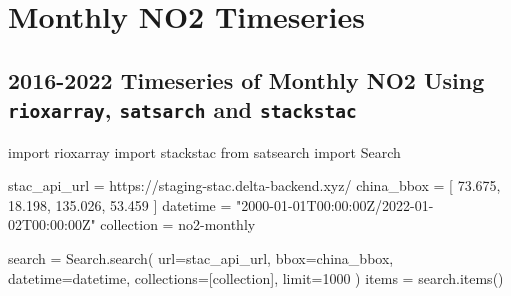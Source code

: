 \documentclass[
  letterpaper,
  DIV=11,
  numbers=noendperiod]{scrreprt}
\author{}
\date{}
\newenvironment{Shaded}{\begin{snugshade}}{\end{snugshade}}
\newcommand{\DecValTok}[1]{\textcolor[rgb]{0.68,0.00,0.00}{#1}}
\newcommand{\FloatTok}[1]{\textcolor[rgb]{0.68,0.00,0.00}{#1}}
\newcommand{\ImportTok}[1]{\textcolor[rgb]{0.00,0.46,0.62}{#1}}
\newcommand{\NormalTok}[1]{\textcolor[rgb]{0.00,0.46,0.62}{#1}}
\newcommand{\OperatorTok}[1]{\textcolor[rgb]{0.37,0.37,0.37}{#1}}
\newcommand{\StringTok}[1]{\textcolor[rgb]{0.13,0.47,0.30}{#1}}
\begin{document}
\hypertarget{monthly-no2-timeseries}{%
\chapter*{Monthly NO2 Timeseries}\label{monthly-no2-timeseries}}

\hypertarget{timeseries-of-monthly-no2-using-rioxarray-satsarch-and-stackstac}{%
\section{\texorpdfstring{2016-2022 Timeseries of Monthly NO2 Using
\texttt{rioxarray}, \texttt{satsarch} and
\texttt{stackstac}}{2016-2022 Timeseries of Monthly NO2 Using rioxarray, satsarch and stackstac}}\label{timeseries-of-monthly-no2-using-rioxarray-satsarch-and-stackstac}}

\begin{Shaded}
\begin{Highlighting}[]
\ImportTok{import}\NormalTok{ rioxarray}
\ImportTok{import}\NormalTok{ stackstac}
\ImportTok{from}\NormalTok{ satsearch }\ImportTok{import}\NormalTok{ Search}
\end{Highlighting}
\end{Shaded}

\begin{Shaded}
\begin{Highlighting}[]
\NormalTok{stac\_api\_url }\OperatorTok{=} \StringTok{\textquotesingle{}https://staging{-}stac.delta{-}backend.xyz/\textquotesingle{}}
\NormalTok{china\_bbox }\OperatorTok{=}\NormalTok{ [}
    \FloatTok{73.675}\NormalTok{,}
    \FloatTok{18.198}\NormalTok{,}
    \FloatTok{135.026}\NormalTok{,}
    \FloatTok{53.459}
\NormalTok{]}
\NormalTok{datetime }\OperatorTok{=} \StringTok{"2000{-}01{-}01T00:00:00Z/2022{-}01{-}02T00:00:00Z"}
\NormalTok{collection }\OperatorTok{=} \StringTok{\textquotesingle{}no2{-}monthly\textquotesingle{}}

\NormalTok{search }\OperatorTok{=}\NormalTok{ Search.search(}
\NormalTok{    url}\OperatorTok{=}\NormalTok{stac\_api\_url,}
\NormalTok{    bbox}\OperatorTok{=}\NormalTok{china\_bbox,}
\NormalTok{    datetime}\OperatorTok{=}\NormalTok{datetime,}
\NormalTok{    collections}\OperatorTok{=}\NormalTok{[collection],}
\NormalTok{    limit}\OperatorTok{=}\DecValTok{1000}
\NormalTok{)}
\NormalTok{items }\OperatorTok{=}\NormalTok{ search.items()}
\end{Highlighting}
\end{Shaded}
\end{document}

